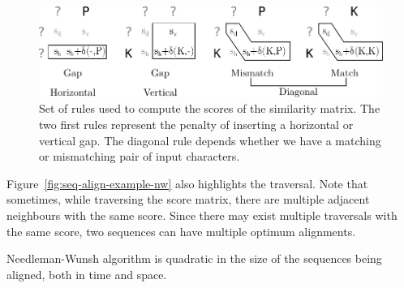 \begin{figure}[h]
  \centering
  \includegraphics[scale=0.8]{src/background/figs/seq-align-rules}
  \caption{Set of rules used to compute the scores of the similarity matrix.
           The two first rules represent the penalty of inserting a horizontal or vertical gap.
           The diagonal rule depends whether we have a matching or mismatching pair of input characters.}
  \label{fig:seq-align-rules}
\end{figure}


Figure~\ref{fig:seq-align-example-nw} also highlights the traversal. 
Note that sometimes, while traversing the score matrix, there are multiple adjacent neighbours with the same score.
Since there may exist multiple traversals with the same score, two sequences can have multiple optimum alignments.

Needleman-Wunsh algorithm is quadratic in the size of the sequences being aligned, both in time and space.

